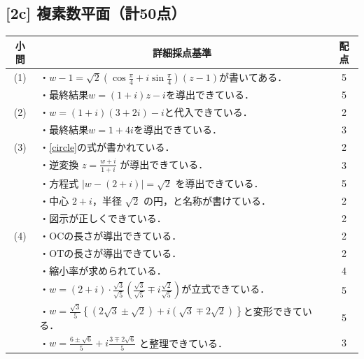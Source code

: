 \documentclass[dvipdfmx]{jlreq}
\theoremstyle{definition}
\begin{document}
\subsection*{[2c] 複素数平面（計50点）}
\begin{longtable}{|c|p{11cm}|c|}
\hline
小問 & \multicolumn{1}{c|}{詳細採点基準} & 配点 \\ \hline
(1) & ・$w - 1 = \sqrt{2} \left( \cos \frac{\pi}{4} + i \sin \frac{\pi}{4} \right) (z - 1)$が書いてある．& 5 \\
    & ・最終結果$w = (1+i)z - i$を導出できている． & 5 \\ \hline
(2) & ・$w = (1+i)(3+2i) - i$と代入できている．& 2 \\ 
    & ・最終結果$w=1+4i$を導出できている． & 3 \\ \hline
(3) & ・\ref{circle}の式が書かれている．& 2 \\
    & ・逆変換 $z=\frac{w+i}{1+i}$ が導出できている．& 3 \\
    & ・方程式 $|w-(2+i)|=\sqrt{2}$ を導出できている． & 5 \\
    & ・中心 $2+i$，半径 $\sqrt{2}$ の円，と名称が書けている． & 2 \\ 
    & ・図示が正しくできている．& 2 \\\hline
(4) & ・$\mathrm{OC}$の長さが導出できている．& 2 \\
    & ・$\mathrm{OT}$の長さが導出できている．& 2 \\
    & ・縮小率が求められている．& 4 \\
    & ・$w = (2+i) \cdot \frac{\sqrt{3}}{\sqrt{5}} \left( \frac{\sqrt{3}}{\sqrt{5}} \mp i \frac{\sqrt{2}}{\sqrt{5}} \right)$が立式できている． & 5 \\
    & ・$w= \frac{\sqrt{3}}{5} \left\{ (2\sqrt{3} \pm \sqrt{2}) + i(\sqrt{3} \mp 2\sqrt{2}) \right\}$と変形できている．& 5 \\
    & ・$w=\frac{6 \pm \sqrt{6}}{5} + i \frac{3 \mp 2\sqrt{6}}{5}$ と整理できている．& 3 \\ \hline
\end{longtable}
\end{document}
